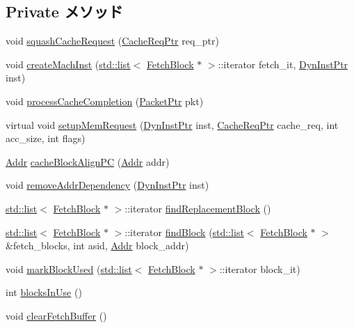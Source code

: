 \subsection*{Private メソッド}
\begin{DoxyCompactItemize}
\item 
void \hyperlink{classFetchUnit_ac2831520eb121be08811b040992f416b}{squashCacheRequest} (\hyperlink{classCacheRequest}{CacheReqPtr} req\_\-ptr)
\item 
void \hyperlink{classFetchUnit_a38dd226fde9580d1753032305635353f}{createMachInst} (\hyperlink{classstd_1_1list}{std::list}$<$ \hyperlink{structFetchUnit_1_1FetchBlock}{FetchBlock} $\ast$ $>$::iterator fetch\_\-it, \hyperlink{classRefCountingPtr}{DynInstPtr} inst)
\item 
void \hyperlink{classFetchUnit_a3dc029c2e87eb911352b82ff15c86236}{processCacheCompletion} (\hyperlink{classPacket}{PacketPtr} pkt)
\item 
virtual void \hyperlink{classFetchUnit_aa942d730ea26d41b72db771cc951f51e}{setupMemRequest} (\hyperlink{classRefCountingPtr}{DynInstPtr} inst, \hyperlink{classCacheRequest}{CacheReqPtr} cache\_\-req, int acc\_\-size, int flags)
\item 
\hyperlink{base_2types_8hh_af1bb03d6a4ee096394a6749f0a169232}{Addr} \hyperlink{classFetchUnit_ab36871bdfd10e2b804a650594462b36e}{cacheBlockAlignPC} (\hyperlink{base_2types_8hh_af1bb03d6a4ee096394a6749f0a169232}{Addr} addr)
\item 
void \hyperlink{classFetchUnit_a8a894d91761439227fd27d91a318c31f}{removeAddrDependency} (\hyperlink{classRefCountingPtr}{DynInstPtr} inst)
\item 
\hyperlink{classstd_1_1list}{std::list}$<$ \hyperlink{structFetchUnit_1_1FetchBlock}{FetchBlock} $\ast$ $>$::iterator \hyperlink{classFetchUnit_aa2c07c0c9648d711cd5916edb942dd4f}{findReplacementBlock} ()
\item 
\hyperlink{classstd_1_1list}{std::list}$<$ \hyperlink{structFetchUnit_1_1FetchBlock}{FetchBlock} $\ast$ $>$::iterator \hyperlink{classFetchUnit_ac92ba32e2d79eb977cc570fc6da90fcd}{findBlock} (\hyperlink{classstd_1_1list}{std::list}$<$ \hyperlink{structFetchUnit_1_1FetchBlock}{FetchBlock} $\ast$ $>$ \&fetch\_\-blocks, int asid, \hyperlink{base_2types_8hh_af1bb03d6a4ee096394a6749f0a169232}{Addr} block\_\-addr)
\item 
void \hyperlink{classFetchUnit_aa7abce4f82cf68e0c338953fb41e3fc8}{markBlockUsed} (\hyperlink{classstd_1_1list}{std::list}$<$ \hyperlink{structFetchUnit_1_1FetchBlock}{FetchBlock} $\ast$ $>$::iterator block\_\-it)
\item 
int \hyperlink{classFetchUnit_a09d558cb19e49cebfa44ecfad6ca98d7}{blocksInUse} ()
\item 
void \hyperlink{classFetchUnit_a2ccfb855f570dc8e39e9d25d3fb845a3}{clearFetchBuffer} ()
\end{DoxyCompactItemize}
